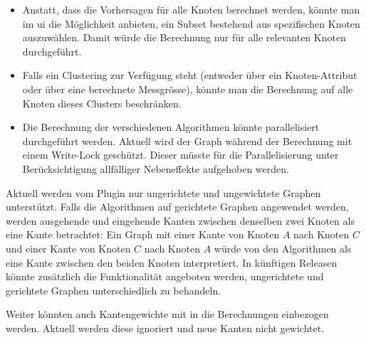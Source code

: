 \begin{itemize}
    \item Anstatt, dass die Vorhersagen für alle Knoten berechnet werden, könnte man im \acs{ui} die Möglichkeit anbieten, ein Subset bestehend aus spezifischen Knoten auszuwählen. Damit würde die Berechnung nur für alle relevanten Knoten durchgeführt.
    \item Falls ein Clustering zur Verfügung steht (entweder über ein Knoten-Attribut oder über eine berechnete Messgrösse), könnte man die Berechnung auf alle Knoten dieses Clusters beschränken.
    \item Die Berechnung der verschiedenen Algorithmen könnte parallelisiert durchgeführt werden. Aktuell wird der Graph während der Berechnung mit einem Write-Lock geschützt. Dieser müsste für die Parallelisierung unter Berücksichtigung allfälliger Nebeneffekte aufgehoben werden.
\end{itemize}

Aktuell werden vom Plugin nur ungerichtete und ungewichtete Graphen unterstützt.
Falls die Algorithmen auf gerichtete Graphen angewendet werden, werden ausgehende und eingehende Kanten zwischen denselben zwei Knoten als eine Kante betrachtet:
Ein Graph mit einer Kante von Knoten $A$ nach Knoten $C$ und einer Kante von Knoten $C$ nach Knoten $A$ würde von den Algorithmen als eine Kante zwischen den beiden Knoten interpretiert.
In künftigen Releasen könnte zusätzlich die Funktionalität angeboten werden, ungerichtete und gerichtete Graphen unterschiedlich zu behandeln.

Weiter könnten auch Kantengewichte mit in die Berechnungen einbezogen werden.
Aktuell werden diese ignoriert und neue Kanten nicht gewichtet.
